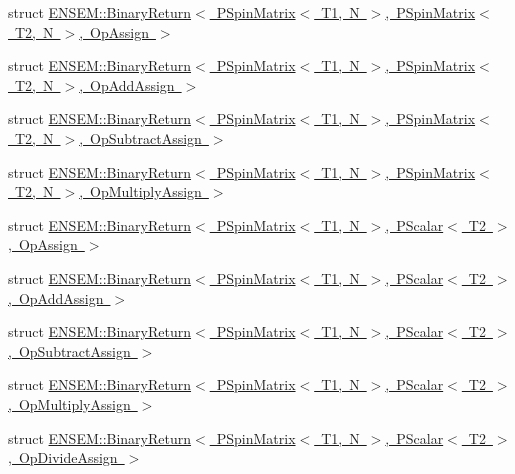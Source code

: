 \begin{DoxyCompactItemize}
\item 
struct \mbox{\hyperlink{structENSEM_1_1BinaryReturn_3_01PSpinMatrix_3_01T1_00_01N_01_4_00_01PSpinMatrix_3_01T2_00_01N_01_4_00_01OpAssign_01_4}{E\+N\+S\+E\+M\+::\+Binary\+Return$<$ P\+Spin\+Matrix$<$ T1, N $>$, P\+Spin\+Matrix$<$ T2, N $>$, Op\+Assign $>$}}
\item 
struct \mbox{\hyperlink{structENSEM_1_1BinaryReturn_3_01PSpinMatrix_3_01T1_00_01N_01_4_00_01PSpinMatrix_3_01T2_00_01N_01_4_00_01OpAddAssign_01_4}{E\+N\+S\+E\+M\+::\+Binary\+Return$<$ P\+Spin\+Matrix$<$ T1, N $>$, P\+Spin\+Matrix$<$ T2, N $>$, Op\+Add\+Assign $>$}}
\item 
struct \mbox{\hyperlink{structENSEM_1_1BinaryReturn_3_01PSpinMatrix_3_01T1_00_01N_01_4_00_01PSpinMatrix_3_01T2_00_01N_01_4_00_01OpSubtractAssign_01_4}{E\+N\+S\+E\+M\+::\+Binary\+Return$<$ P\+Spin\+Matrix$<$ T1, N $>$, P\+Spin\+Matrix$<$ T2, N $>$, Op\+Subtract\+Assign $>$}}
\item 
struct \mbox{\hyperlink{structENSEM_1_1BinaryReturn_3_01PSpinMatrix_3_01T1_00_01N_01_4_00_01PSpinMatrix_3_01T2_00_01N_01_4_00_01OpMultiplyAssign_01_4}{E\+N\+S\+E\+M\+::\+Binary\+Return$<$ P\+Spin\+Matrix$<$ T1, N $>$, P\+Spin\+Matrix$<$ T2, N $>$, Op\+Multiply\+Assign $>$}}
\item 
struct \mbox{\hyperlink{structENSEM_1_1BinaryReturn_3_01PSpinMatrix_3_01T1_00_01N_01_4_00_01PScalar_3_01T2_01_4_00_01OpAssign_01_4}{E\+N\+S\+E\+M\+::\+Binary\+Return$<$ P\+Spin\+Matrix$<$ T1, N $>$, P\+Scalar$<$ T2 $>$, Op\+Assign $>$}}
\item 
struct \mbox{\hyperlink{structENSEM_1_1BinaryReturn_3_01PSpinMatrix_3_01T1_00_01N_01_4_00_01PScalar_3_01T2_01_4_00_01OpAddAssign_01_4}{E\+N\+S\+E\+M\+::\+Binary\+Return$<$ P\+Spin\+Matrix$<$ T1, N $>$, P\+Scalar$<$ T2 $>$, Op\+Add\+Assign $>$}}
\item 
struct \mbox{\hyperlink{structENSEM_1_1BinaryReturn_3_01PSpinMatrix_3_01T1_00_01N_01_4_00_01PScalar_3_01T2_01_4_00_01OpSubtractAssign_01_4}{E\+N\+S\+E\+M\+::\+Binary\+Return$<$ P\+Spin\+Matrix$<$ T1, N $>$, P\+Scalar$<$ T2 $>$, Op\+Subtract\+Assign $>$}}
\item 
struct \mbox{\hyperlink{structENSEM_1_1BinaryReturn_3_01PSpinMatrix_3_01T1_00_01N_01_4_00_01PScalar_3_01T2_01_4_00_01OpMultiplyAssign_01_4}{E\+N\+S\+E\+M\+::\+Binary\+Return$<$ P\+Spin\+Matrix$<$ T1, N $>$, P\+Scalar$<$ T2 $>$, Op\+Multiply\+Assign $>$}}
\item 
struct \mbox{\hyperlink{structENSEM_1_1BinaryReturn_3_01PSpinMatrix_3_01T1_00_01N_01_4_00_01PScalar_3_01T2_01_4_00_01OpDivideAssign_01_4}{E\+N\+S\+E\+M\+::\+Binary\+Return$<$ P\+Spin\+Matrix$<$ T1, N $>$, P\+Scalar$<$ T2 $>$, Op\+Divide\+Assign $>$}}

\end{DoxyCompactItemize}
